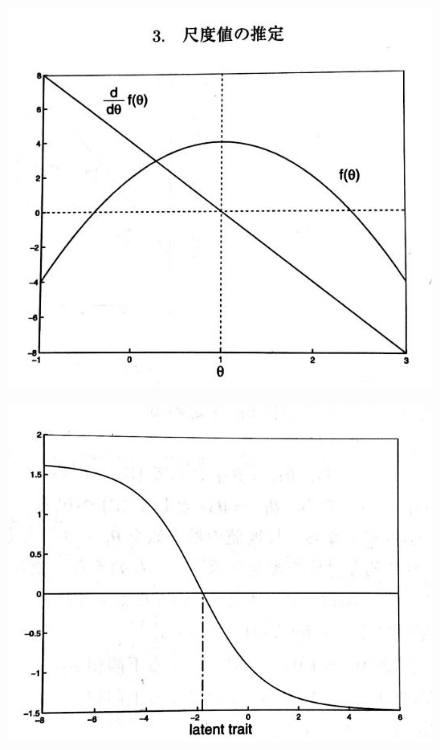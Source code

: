 \documentclass[12pt]{jarticle}
\begin{document}
\newpage
\begin{figure}[H]
  \includegraphics[bb = 50 500 1 1,scale = 0.45]{5.jpg}
\end{figure}
\begin{figure}[H]
  \includegraphics[bb = -500 400 1 1,scale = 0.45]{6.jpg}
\end{figure}
\end{document}
